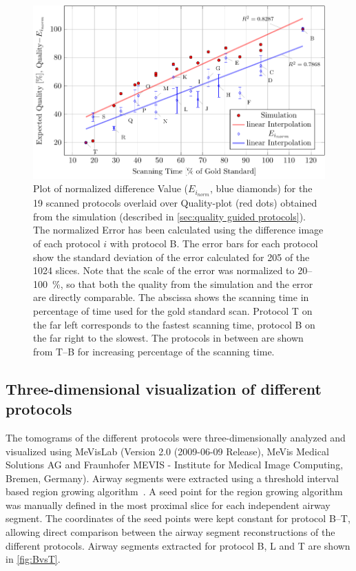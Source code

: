 \begin{figure}
	\centering
	\includegraphics[width=\linewidth]{img/Haberthuer2010/Fig06-Plot}
	\caption[Plot of normalized difference Value for the scanned protocols overlaid over Quality-plot obtained from the simulation]{Plot of normalized difference Value ($E_{i_{norm}}$, blue diamonds) for the 19 scanned protocols overlaid over Quality-plot (red dots) obtained from the simulation (described in \autoref{sec:quality guided protocols}). The normalized Error has been calculated using the difference image of each protocol $i$ with protocol B. The error bars for each protocol show the standard deviation of the error calculated for 205 of the 1024 slices. Note that the scale of the error was normalized to 20--\SI{100}{\percent}, so that both the quality from the simulation and the error are directly comparable. The abscissa shows the scanning time in percentage of time used for the gold standard scan. Protocol T on the far left corresponds to the fastest scanning time, protocol B on the far right to the slowest. The protocols in between are shown from T--B for increasing percentage of the scanning time.}
	\label{fig:NormalizedErrorPlot}
\end{figure}

\subsection{Three-dimensional visualization of different protocols}
\label{subsec:comparison}
The tomograms of the different protocols were three-dimensionally analyzed and visualized using MeVisLab (Version 2.0 (2009-06-09 Release), MeVis Medical Solutions AG and Fraunhofer MEVIS - Institute for Medical Image Computing, Bremen, Germany). Airway segments were extracted using a threshold interval based region growing algorithm~\cite{Zucker1976}. A seed point for the region growing algorithm was manually defined in the most proximal slice for each independent airway segment. The coordinates of the seed points were kept constant for protocol B--T, allowing direct comparison between the airway segment reconstructions of the different protocols. Airway segments extracted for protocol B, L and T are shown in \autoref{fig:BvsT}.

